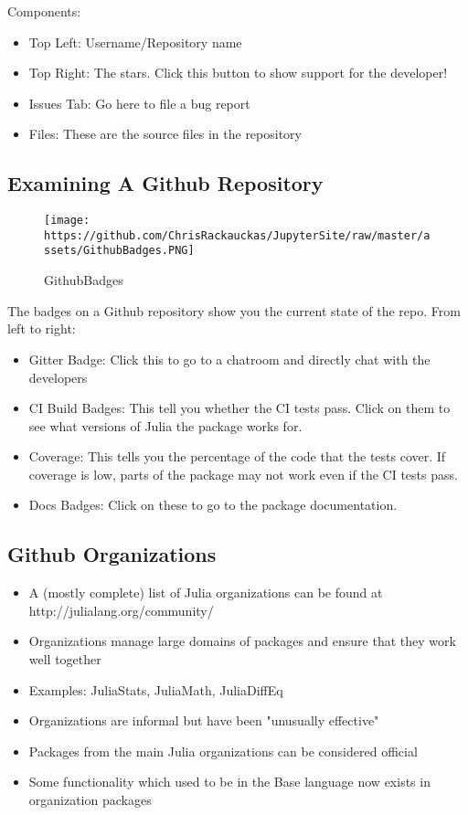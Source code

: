 \documentclass[11pt]{article}
\makeatletter
\def\maxwidth{\ifdim\Gin@nat@width>\linewidth\linewidth
    \else\Gin@nat@width\fi}
\let\Oldincludegraphics\includegraphics
\renewcommand{\includegraphics}[1]{\Oldincludegraphics[width=.8\maxwidth]{#1}}
\providecommand{\tightlist}{%
      \setlength{\itemsep}{0pt}\setlength{\parskip}{0pt}}
\makeatother
\begin{document}
Components:

\begin{itemize}
\tightlist
\item
  Top Left: Username/Repository name
\item
  Top Right: The stars. Click this button to show support for the
  developer!
\item
  Issues Tab: Go here to file a bug report
\item
  Files: These are the source files in the repository
\end{itemize}

    \subsection{Examining A Github
Repository}\label{examining-a-github-repository}

\begin{figure}
\centering
\texttt{[image: https://github.com/ChrisRackauckas/JupyterSite/raw/master/assets/GithubBadges.PNG]}
\caption{GithubBadges}
\end{figure}

The badges on a Github repository show you the current state of the
repo. From left to right:

\begin{itemize}
\tightlist
\item
  Gitter Badge: Click this to go to a chatroom and directly chat with
  the developers
\item
  CI Build Badges: This tell you whether the CI tests pass. Click on
  them to see what versions of Julia the package works for.
\item
  Coverage: This tells you the percentage of the code that the tests
  cover. If coverage is low, parts of the package may not work even if
  the CI tests pass.
\item
  Docs Badges: Click on these to go to the package documentation.
\end{itemize}

    \subsection{Github Organizations}\label{github-organizations}

\begin{itemize}
\tightlist
\item
  A (mostly complete) list of Julia organizations can be found at
  http://julialang.org/community/
\item
  Organizations manage large domains of packages and ensure that they
  work well together
\item
  Examples: JuliaStats, JuliaMath, JuliaDiffEq
\item
  Organizations are informal but have been "unusually effective"
\item
  Packages from the main Julia organizations can be considered official
\item
  Some functionality which used to be in the Base language now exists in
  organization packages
\end{itemize}
\end{document}
